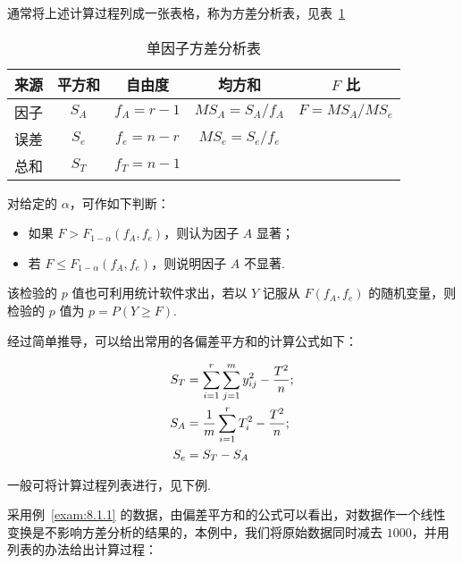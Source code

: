 通常将上述计算过程列成一张表格，称为方差分析表，见表~\ref{tab:8.1.3}

\begin{table}[htbp]
\centering
\caption{单因子方差分析表\label{tab:8.1.3}}
\begin{tabular}{ccccc}
\toprule
来源 & 平方和 & 自由度 & 均方和 & $F$ 比\\
\midrule
因子 & $S_A$ & $f_{A} = r-1$ & $MS_{A} = S_{A}/f_A$ & $F = MS_{A}/MS_{e}$ \\
误差 & $S_{e}$ & $f_{e} = n - r$ & $MS_{e} = S_e/f_e$ & \\
\midrule
总和 & $S_{T}$ & $f_{T} = n - 1$ & & \\
\bottomrule 
\end{tabular}
\end{table}

对给定的 $\alpha$，可作如下判断：
\begin{itemize}
\item 如果 $F > F_{1-\alpha}(f_A,f_e)$，则认为因子 $A$ 显著；
\item 若 $F \leq F_{1-\alpha}(f_A, f_e)$，则说明因子 $A$ 不显著.
\end{itemize}
该检验的 $p$ 值也可利用统计软件求出，若以 $Y$ 记服从 $F(f_A,f_e)$ 的随机变量，则检验的 $p$ 值为 $p = P(Y \geq F)$.

经过简单推导，可以给出常用的各偏差平方和的计算公式如下：

\begin{align}
S_T &= \sum_{i=1}^{r}\sum_{j=1}^{m} y_{ij}^2 - \frac{T^2}{n}; \notag\\
S_A &= \frac{1}{m} \sum_{i=1}^{r} T_{i}^2 - \frac{T^2}{n}; \label{eq:8.1.19}\\
S_e &= S_T - S_A \notag
\end{align}

一般可将计算过程列表进行，见下例.

\begin{example}\label{exam:8.1.2}
采用例~\ref{exam:8.1.1} 的数据，由偏差平方和的公式可以看出，对数据作一个线性变换是不影响方差分析的结果的，本例中，我们将原始数据同时减去 $1000$，并用列表的办法给出计算过程：
\end{example}

